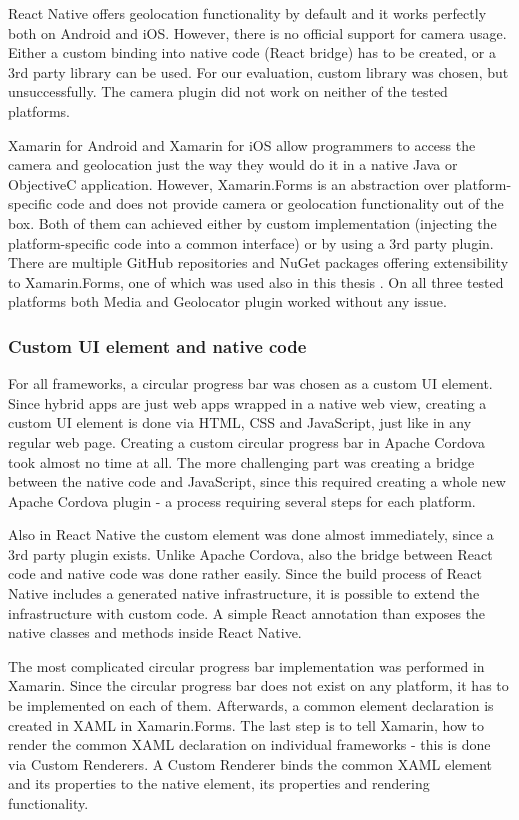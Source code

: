 \documentclass[english,master,public,dept460,male,cpdeclaration,oneside]{diploma}
\begin{document}
React Native offers geolocation functionality by default and it works perfectly both on Android and iOS. However, there is no official support for camera usage. Either a custom binding into native code (React bridge) has to be created, or a 3rd party library can be used. For our evaluation, custom library \cite{reactNativeCamera} was chosen, but unsuccessfully. The camera plugin did not work on neither of the tested platforms.

Xamarin for Android and Xamarin for iOS allow programmers to access the camera and geolocation just the way they would do it in a native Java or ObjectiveC application. However, Xamarin.Forms is an abstraction over platform-specific code and does not provide camera or geolocation functionality out of the box. Both of them can achieved either by custom implementation (injecting the platform-specific code into a common interface) or by using a 3rd party plugin. There are multiple GitHub repositories and NuGet packages offering extensibility to Xamarin.Forms, one of which was used also in this thesis \cite{xamarinPlugins}. On all three tested platforms both Media and Geolocator plugin worked without any issue. 

\subsubsection{Custom UI element and native code}
For all frameworks, a circular progress bar was chosen as a custom UI element. Since hybrid apps are just web apps wrapped in a native web view, creating a custom UI element is done via HTML, CSS and JavaScript, just like in any regular web page. Creating a custom circular progress bar in Apache Cordova took almost no time at all. 
The more challenging part was creating a bridge between the native code and JavaScript, since this required creating a whole new Apache Cordova plugin - a process requiring several steps for each platform.

Also in React Native the custom element was done almost immediately, since a 3rd party plugin exists. Unlike Apache Cordova, also the bridge between React code and native code was done rather easily. Since the build process of React Native includes a generated native infrastructure, it is possible to extend the infrastructure with custom code. A simple React annotation than exposes the native classes and methods inside React Native.

The most complicated circular progress bar implementation was performed in Xamarin. Since the circular progress bar does not exist on any platform, it has to be implemented on each of them. Afterwards, a common element declaration is created in XAML in Xamarin.Forms. The last step is to tell Xamarin, how to render the common XAML declaration on individual frameworks - this is done via Custom Renderers. A Custom Renderer binds the common XAML element and its properties to the native element, its properties and rendering functionality.
\end{document}
